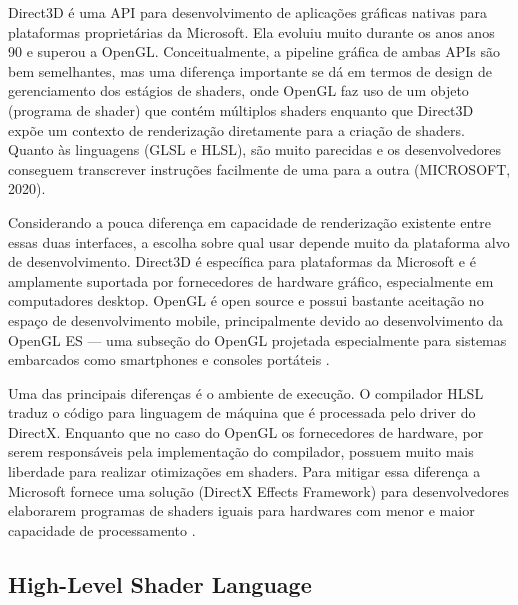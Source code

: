 Direct3D é uma API para desenvolvimento de aplicações gráficas nativas para plataformas proprietárias da Microsoft. Ela evoluiu muito durante os anos anos 90 e superou a OpenGL. Conceitualmente, a pipeline gráfica de ambas APIs são bem semelhantes, mas uma diferença importante se dá em termos de design de gerenciamento dos estágios de shaders, onde OpenGL faz uso de um objeto (programa de shader) que contém múltiplos shaders enquanto que Direct3D expõe um contexto de renderização diretamente para a criação de shaders. Quanto às linguagens (GLSL e HLSL), são muito parecidas e os desenvolvedores conseguem transcrever instruções facilmente de uma para a outra (MICROSOFT, 2020)\nocite{Direct3D}.

Considerando a pouca diferença em capacidade de renderização existente entre essas duas interfaces, a escolha sobre qual usar depende muito da plataforma alvo de desenvolvimento. Direct3D é específica para plataformas da Microsoft e é amplamente suportada por fornecedores de hardware gráfico, especialmente em computadores desktop. OpenGL é open source e possui bastante aceitação no espaço de desenvolvimento mobile, principalmente devido ao desenvolvimento da OpenGL ES --- uma subseção do OpenGL projetada especialmente para sistemas embarcados como smartphones e consoles portáteis \cite{HLSLBook}.

Uma das principais diferenças é o ambiente de execução. O compilador HLSL traduz o código para linguagem de máquina que é processada pelo driver do DirectX. Enquanto que no caso do OpenGL os fornecedores de hardware, por serem responsáveis pela implementação do compilador, possuem muito mais liberdade para realizar otimizações em shaders. Para mitigar essa diferença a Microsoft fornece uma solução (DirectX Effects Framework) para desenvolvedores elaborarem programas de shaders iguais para hardwares com menor e maior capacidade de processamento \cite{GLSLBook}.

\subsection{High-Level Shader Language}
\label{sec:hlsl}

\begin{figure}[h!]
	\centering
\end{figure}

